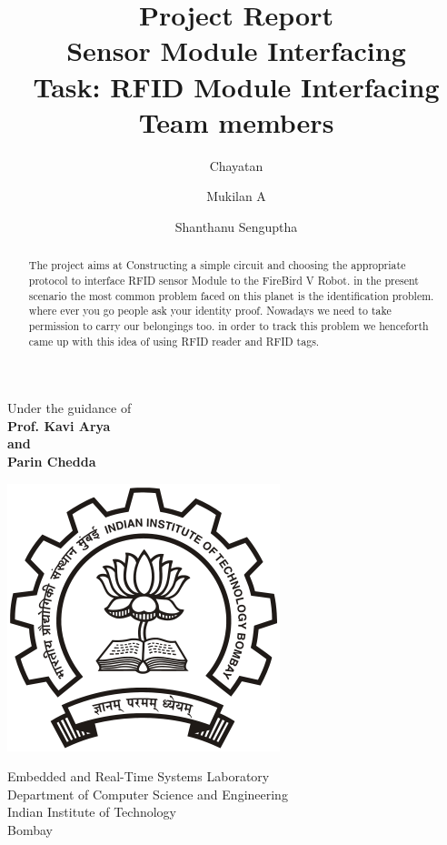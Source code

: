 \documentclass[a4paper,29.6pt]{article}
\title {Project Report \\ Sensor Module Interfacing \\[10pt] Task: RFID Module Interfacing \\[25pt] Team members }
\author {Chayatan \and Mukilan A \and Shanthanu Senguptha}
\begin{document}
\maketitle
\begin{center}
\begin{large}
Under the guidance of\\
\textbf{Prof. Kavi Arya\\and\\Parin Chedda}\\
\vspace{0.5in}
\end{large}
\end{center}
\begin{center}
\includegraphics[scale=0.32]{images/iitb}
\end{center}
\begin{center}
\begin{large}
Embedded and Real-Time Systems Laboratory \\
Department of Computer Science and Engineering \\
Indian Institute of Technology \\
Bombay \\
\end{large}
\end{center}

\newpage
\tableofcontents
\newpage

\begin{abstract}
The project aims at Constructing a simple circuit and choosing the appropriate protocol to interface RFID sensor Module to the FireBird V Robot. in the present scenario the most common problem faced on this planet is the identification problem. where ever you go people ask your identity proof. Nowadays we need to take permission to carry our belongings too. in order to track this problem we henceforth came up with this idea of using RFID reader and RFID tags. 
\end{abstract}
\end{document}
